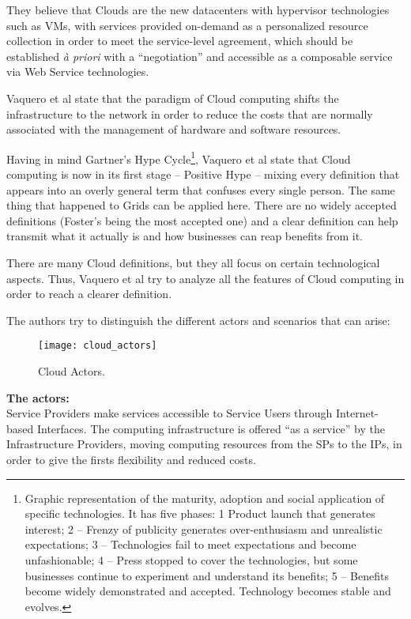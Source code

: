 They believe that Clouds are the new datacenters with hypervisor technologies such as VMs, with services provided on-demand as a personalized resource collection in order to meet the service-level agreement, which should be established \textit{à priori} with a ``negotiation'' and accessible as a composable service via Web Service technologies.


Vaquero et al state that the paradigm of Cloud computing shifts the infrastructure to the network in order to reduce the costs that are normally associated with the management of hardware and software resources.  

Having in mind Gartner’s Hype Cycle\footnote{Graphic representation of the maturity, adoption and social application of specific technologies. It has five phases: 1  Product launch that generates interest; 2 -- Frenzy of publicity generates over-enthusiasm and unrealistic expectations; 3 -- Technologies fail to meet expectations and become unfashionable; 4 -- Press stopped to cover the technologies, but some businesses continue to experiment and understand its benefits; 5 -- Benefits become widely demonstrated and accepted. Technology becomes stable and evolves.}, Vaquero et al state that Cloud computing is now in its first stage – Positive Hype – mixing every definition that appears into an overly general term that confuses every single person. The same thing that happened to Grids can be applied here. There are no widely accepted definitions (Foster’s being the most accepted one) and a clear definition can help transmit what it actually is and how businesses can reap benefits from it.

There are many Cloud definitions, but they all focus on certain technological aspects. Thus, Vaquero et al try to analyze all the features of Cloud computing in order to reach a clearer definition.

The authors try to distinguish the different actors and scenarios that can arise:

\begin{figure}[t]
  \begin{center}
    \leavevmode
    \texttt{[image: cloud\_actors]}
    \caption{Cloud Actors.~\cite{Buyya2009599}}
    \label{fig:cloud_actors}
  \end{center}
\end{figure}

\textbf{The actors:}\\
Service Providers make services accessible to Service Users through Internet-based Interfaces. The computing infrastructure is offered “as a service” by the Infrastructure Providers, moving computing resources from the SPs to the IPs, in order to give the firsts flexibility and reduced costs.

